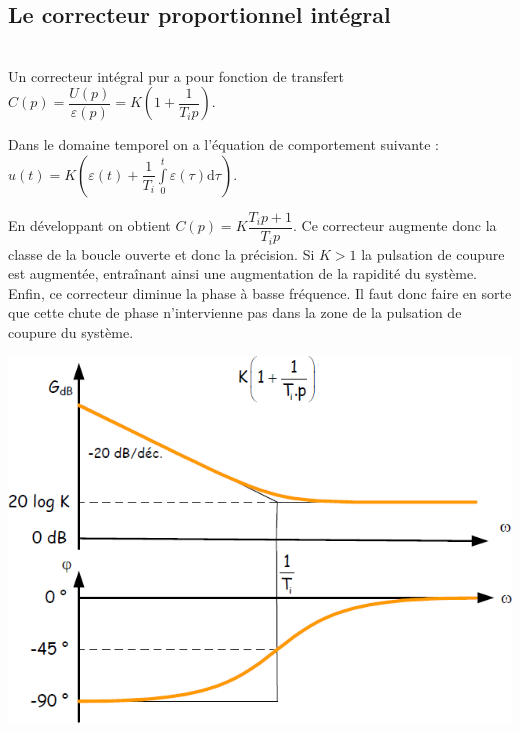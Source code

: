 \documentclass[10pt,fleqn]{article} %
\begin{document}
\subsection{Le correcteur proportionnel intégral}

\noindent\begin{minipage}[c]{.49\linewidth}
\begin{defi} ~\\

Un correcteur intégral pur a pour fonction de transfert $C(p)=\dfrac{U(p)}{\varepsilon(p)}=K\left( 1+\dfrac{1}{T_i p}\right)$.

Dans le domaine temporel on a l'équation de comportement suivante : $u(t)=K\left(\varepsilon(t)+\dfrac{1}{T_i}\int\limits_0^t \varepsilon (\tau)\text{d}\tau\right)$.
\end{defi}

En développant on obtient $C(p)=K\dfrac{T_i p+1}{T_i p}$. Ce correcteur augmente donc la classe de la boucle ouverte et donc la précision. Si $K>1$ la pulsation de coupure est augmentée, entraînant ainsi une augmentation de la rapidité du système. Enfin, ce correcteur diminue la phase à basse fréquence. Il faut donc faire en sorte que cette chute de phase n'intervienne pas dans la zone de la pulsation de coupure du système.
\end{minipage} \hfill
\begin{minipage}[c]{.49\linewidth}
\begin{center}
\includegraphics[width=\linewidth]{images/fig_07}
\end{center}
\end{minipage}
\end{document}
